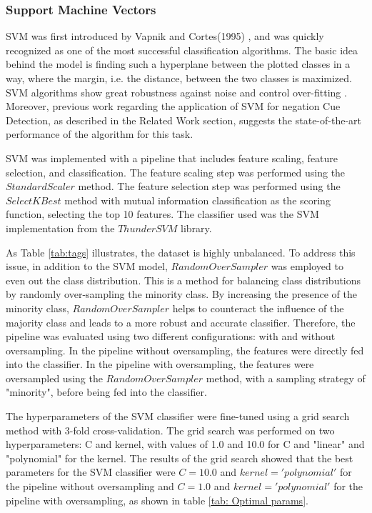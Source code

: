




\subsubsection{Support Machine Vectors}
 SVM was first introduced by Vapnik and Cortes(1995) \cite{vapnik1995}, and was quickly recognized as one of the most successful classification algorithms. The basic idea behind the model is finding such a hyperplane between the plotted classes in a way, where the margin, i.e. the distance, between the two classes is maximized. SVM algorithms show great robustness against noise and control over-fitting \cite{robust2009}. Moreover, previous work regarding the application of SVM for negation Cue Detection, as described in the Related Work section, suggests the state-of-the-art performance of the algorithm for this task. 

SVM was implemented with a pipeline that includes feature scaling, feature selection, and classification. The feature scaling step was performed using the $StandardScaler$ method. The feature selection step was performed using the $SelectKBest$ method with mutual information classification as the scoring function, selecting the top 10 features. The classifier used was the SVM implementation from the $ThunderSVM$ library\cite{thundersvm}.

As Table \ref{tab:tags} illustrates, the dataset is highly unbalanced. To address this issue, in addition to the SVM model, $RandomOverSampler$ was employed to even out the class distribution. This is a method for balancing class distributions by randomly over-sampling the minority class. By increasing the presence of the minority class, $RandomOverSampler$ helps to counteract the influence of the majority class and leads to a more robust and accurate classifier. Therefore, the pipeline was evaluated using two different configurations: with and without oversampling. In the pipeline without oversampling, the features were directly fed into the classifier. In the pipeline with oversampling, the features were oversampled using the $RandomOverSampler$ method, with a sampling strategy of "minority", before being fed into the classifier.

The hyperparameters of the SVM classifier were fine-tuned using a grid search method with 3-fold cross-validation. The grid search was performed on two hyperparameters: C and kernel, with values of 1.0 and 10.0 for C and "linear" and "polynomial" for the kernel. The results of the grid search showed that the best parameters for the SVM classifier were $C=10.0$ and $kernel='polynomial'$ for the pipeline without oversampling and $C=1.0$ and $kernel='polynomial'$ for the pipeline with oversampling, as shown in table \ref{tab: Optimal params}.

